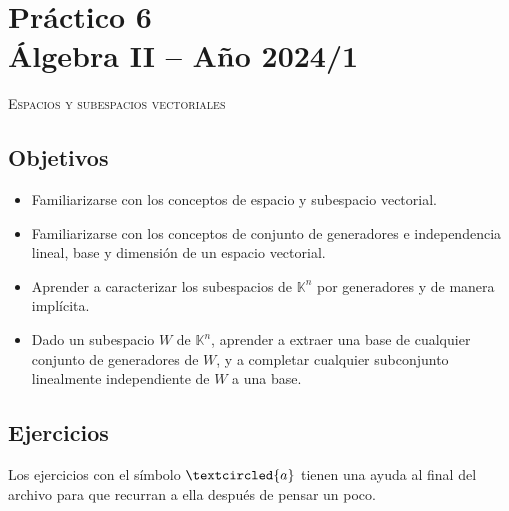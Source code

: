 \section*{Práctico 6 \\ Álgebra  II -- Año 2024/1}\label{practico-6}



\centerline{\textsc{Espacios y subespacios vectoriales}}
    

\subsection*{Objetivos}
    
\begin{itemize}
\item Familiarizarse con los conceptos de espacio y subespacio vectorial.
\item Familiarizarse con los conceptos de conjunto de generadores e independencia lineal, base y dimensión de un espacio vectorial.
        
\item Aprender a caracterizar los subespacios de $\mathbb K^n$ por generadores y de manera implícita.

\item Dado un subespacio $W$ de $\mathbb K^n$, aprender a extraer una base de cualquier conjunto de generadores de $W$, y a completar cualquier subconjunto linealmente independiente de $W$ a una base.

\end{itemize}
    
    
\subsection*{Ejercicios} Los ejercicios con el símbolo $\textcircled{a}$ tienen una ayuda al final del archivo para que recurran a ella después de pensar un poco.

